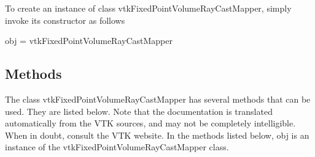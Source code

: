 To create an instance of class vtk\-Fixed\-Point\-Volume\-Ray\-Cast\-Mapper, simply invoke its constructor as follows \begin{DoxyVerb}  obj = vtkFixedPointVolumeRayCastMapper
\end{DoxyVerb}
 \hypertarget{vtkwidgets_vtkxyplotwidget_Methods}{}\subsection{Methods}\label{vtkwidgets_vtkxyplotwidget_Methods}
The class vtk\-Fixed\-Point\-Volume\-Ray\-Cast\-Mapper has several methods that can be used. They are listed below. Note that the documentation is translated automatically from the V\-T\-K sources, and may not be completely intelligible. When in doubt, consult the V\-T\-K website. In the methods listed below, {\ttfamily obj} is an instance of the vtk\-Fixed\-Point\-Volume\-Ray\-Cast\-Mapper class. 
